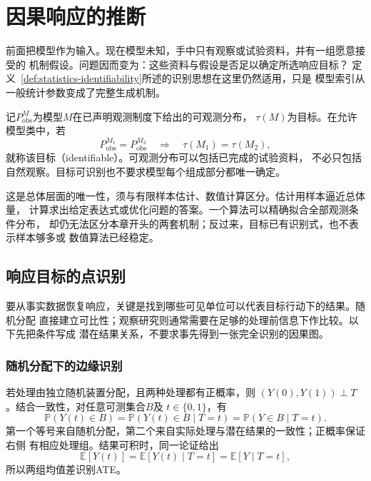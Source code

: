 \section{因果响应的推断}
\label{sec:causal-effect-identification}

前面把模型作为输入。现在模型未知，手中只有观察或试验资料，并有一组愿意接受的
机制假设。问题因而变为：这些资料与假设是否足以确定所选响应目标？
定义~\ref{def:statistics-identifiability}所述的识别思想在这里仍然适用，只是
模型索引从一般统计参数变成了完整生成机制。

记\(P_{\mathrm{obs}}^M\)为模型\(M\)在已声明观测制度下给出的可观测分布，
\(\tau(M)\)为目标。在允许模型类中，若
\[
  P_{\mathrm{obs}}^{M_1}=P_{\mathrm{obs}}^{M_2}
  \quad\Longrightarrow\quad \tau(M_1)=\tau(M_2),
\]
就称该目标（identifiable）。可观测分布可以包括已完成的试验资料，
不必只包括自然观察。目标可识别也不要求模型每个组成部分都唯一确定。

这是总体层面的唯一性，须与有限样本估计、数值计算区分。估计用样本逼近总体量，
计算求出给定表达式或优化问题的答案。一个算法可以精确拟合全部观测条件分布，
却仍无法区分本章开头的两套机制；反过来，目标已有识别式，也不表示样本够多或
数值算法已经稳定。

\subsection{响应目标的点识别}
\label{sec:causal-point-identification}

要从事实数据恢复响应，关键是找到哪些可见单位可以代表目标行动下的结果。随机分配
直接建立可比性；观察研究则通常需要在足够的处理前信息下作比较。以下先把条件写成
潜在结果关系，不要求事先得到一张完全识别的因果图。

\subsubsection{随机分配下的边缘识别}
\label{sec:causal-randomized-identification}

若处理由独立随机装置分配，且两种处理都有正概率，则
\((Y(0),Y(1))\perp T\)。结合一致性，对任意可测集合\(B\)及
\(t\in\{0,1\}\)，有
\begin{equation}
  \mathbb P(Y(t)\in B)
  =
  \mathbb P(Y(t)\in B\mid T=t)
  =
  \mathbb P(Y\in B\mid T=t).
  \label{eq:causal-randomization-marginal-distribution}
\end{equation}
第一个等号来自随机分配，第二个来自实际处理与潜在结果的一致性；正概率保证右侧
有相应处理组。结果可积时，同一论证给出
\[
  \mathbb E[Y(t)]
  =\mathbb E[Y(t)\mid T=t]
  =\mathbb E[Y\mid T=t],
\]
所以两组均值差识别ATE。

